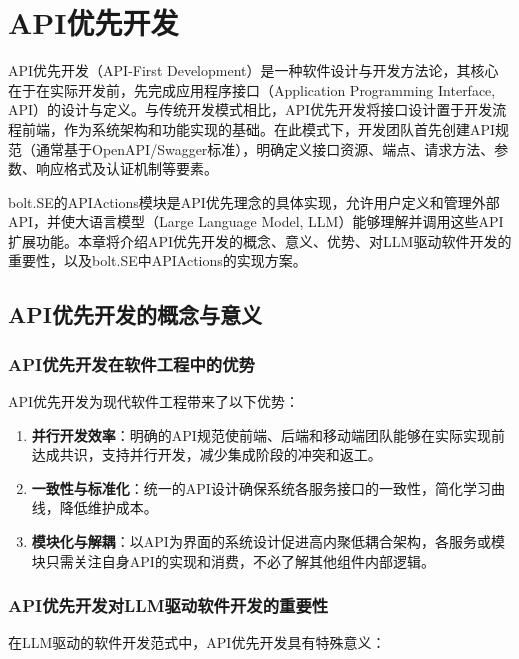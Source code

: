 
\chapter{API优先开发}

API优先开发（API-First Development）是一种软件设计与开发方法论，其核心在于在实际开发前，先完成应用程序接口（Application Programming Interface, API）的设计与定义。与传统开发模式相比，API优先开发将接口设计置于开发流程前端，作为系统架构和功能实现的基础。在此模式下，开发团队首先创建API规范（通常基于OpenAPI/Swagger标准），明确定义接口资源、端点、请求方法、参数、响应格式及认证机制等要素。

bolt.SE的APIActions模块是API优先理念的具体实现，允许用户定义和管理外部API，并使大语言模型（Large Language Model, LLM）能够理解并调用这些API扩展功能。本章将介绍API优先开发的概念、意义、优势、对LLM驱动软件开发的重要性，以及bolt.SE中APIActions的实现方案。

\section{API优先开发的概念与意义}

\subsection{API优先开发在软件工程中的优势}
API优先开发为现代软件工程带来了以下优势：

\begin{enumerate}
  \item \textbf{并行开发效率}：明确的API规范使前端、后端和移动端团队能够在实际实现前达成共识，支持并行开发，减少集成阶段的冲突和返工。
  
  \item \textbf{一致性与标准化}：统一的API设计确保系统各服务接口的一致性，简化学习曲线，降低维护成本。
  
  \item \textbf{模块化与解耦}：以API为界面的系统设计促进高内聚低耦合架构，各服务或模块只需关注自身API的实现和消费，不必了解其他组件内部逻辑。
  
\end{enumerate}

\subsection{API优先开发对LLM驱动软件开发的重要性}
在LLM驱动的软件开发范式中，API优先开发具有特殊意义：

